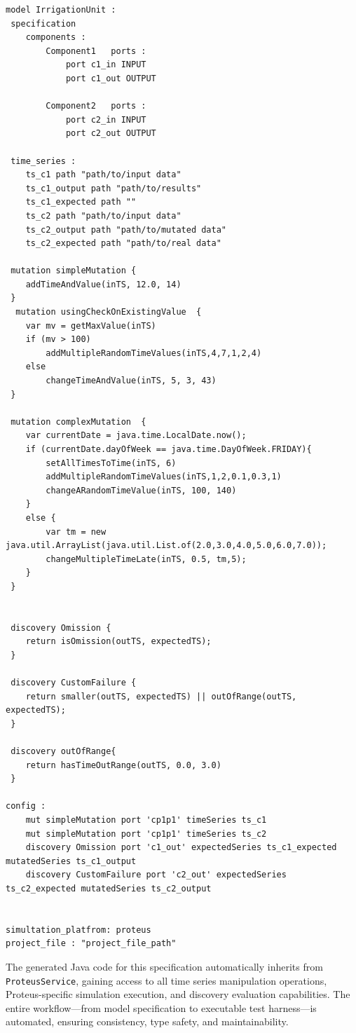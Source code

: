 \begin{lstlisting}[style=JavaStyle,caption=Specification of the irrigation plant in \tool,label=lst:dslSpec]
model IrrigationUnit :
 specification
 	components :
	 	Component1	 ports :
	 		port c1_in INPUT
	 		port c1_out OUTPUT

	 	Component2	 ports :
	 		port c2_in INPUT
	 		port c2_out OUTPUT

 time_series :
 	ts_c1 path "path/to/input data"
	ts_c1_output path "path/to/results"
	ts_c1_expected path ""
	ts_c2 path "path/to/input data"
	ts_c2_output path "path/to/mutated data"
	ts_c2_expected path "path/to/real data"

 mutation simpleMutation {
 	addTimeAndValue(inTS, 12.0, 14)
 }
  mutation usingCheckOnExistingValue  {
 	var mv = getMaxValue(inTS)
 	if (mv > 100)
 		addMultipleRandomTimeValues(inTS,4,7,1,2,4)
 	else
 		changeTimeAndValue(inTS, 5, 3, 43)
 }

 mutation complexMutation  {
 	var currentDate = java.time.LocalDate.now();
 	if (currentDate.dayOfWeek == java.time.DayOfWeek.FRIDAY){
		setAllTimesToTime(inTS, 6)
		addMultipleRandomTimeValues(inTS,1,2,0.1,0.3,1)
 		changeARandomTimeValue(inTS, 100, 140)
 	}
 	else {
 		var tm = new java.util.ArrayList(java.util.List.of(2.0,3.0,4.0,5.0,6.0,7.0));
 		changeMultipleTimeLate(inTS, 0.5, tm,5);
 	}
 }


 discovery Omission {
 	return isOmission(outTS, expectedTS);
 }

 discovery CustomFailure {
 	return smaller(outTS, expectedTS) || outOfRange(outTS, expectedTS);
 }

 discovery outOfRange{
 	return hasTimeOutRange(outTS, 0.0, 3.0)
 }

config :
	mut simpleMutation port 'cp1p1' timeSeries ts_c1
	mut simpleMutation port 'cp1p1' timeSeries ts_c2
	discovery Omission port 'c1_out' expectedSeries ts_c1_expected mutatedSeries ts_c1_output
	discovery CustomFailure port 'c2_out' expectedSeries ts_c2_expected mutatedSeries ts_c2_output


simultation_platfrom: proteus
project_file : "project_file_path"
\end{lstlisting}

The generated Java code for this specification automatically inherits from \texttt{ProteusService}, gaining access to all time series manipulation operations, Proteus-specific simulation execution, and discovery evaluation capabilities. The entire workflow—from model specification to executable test harness—is automated, ensuring consistency, type safety, and maintainability.
